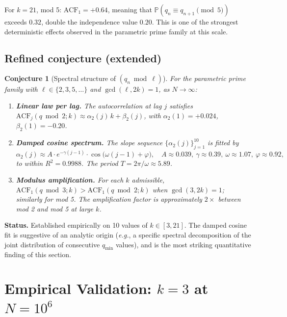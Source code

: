 \documentclass[11pt,a4paper]{article}
\theoremstyle{plain}
\newtheorem{conjecture}[theorem]{Conjecture}
\theoremstyle{definition}
\newcommand{\qmin}{q_{\min}}
\begin{document}
For $k = 21$, mod 5: $\mathrm{ACF}_1 = +0.64$, meaning that
$\mathbb{P}(q_n \equiv q_{n+1} \pmod 5)$ exceeds $0.32$, double the
independence value $0.20$. This is one of the strongest deterministic effects
observed in the parametric prime family at this scale.

\subsection{Refined conjecture (extended)}

\begin{openproblem}
\begin{conjecture}[Spectral structure of $(q_n \bmod \ell)$]\label{conj:acf}
For the parametric prime family with $\ell \in \{2, 3, 5, \ldots\}$ and
$\gcd(\ell, 2k) = 1$, as $N \to \infty$:
\begin{enumerate}[leftmargin=*]
\item \textbf{Linear law per lag.} The autocorrelation at lag $j$ satisfies
$\mathrm{ACF}_j(q \bmod 2; k) \approx \alpha_2(j)\,k + \beta_2(j)$, with
$\alpha_2(1) = +0.024$, $\beta_2(1) = -0.20$.
\item \textbf{Damped cosine spectrum.} The slope sequence $\{\alpha_2(j)\}_{j=1}^{10}$
is fitted by
\[
\alpha_2(j) \approx A \cdot e^{-\gamma(j-1)} \cdot \cos\bigl(\omega(j-1) + \varphi\bigr),
\quad A \approx 0.039,\ \gamma \approx 0.39,\ \omega \approx 1.07,\ \varphi \approx 0.92,
\]
to within $R^2 = 0.9988$. The period $T = 2\pi/\omega \approx 5.89$.
\item \textbf{Modulus amplification.} For each $k$ admissible,
$\mathrm{ACF}_1(q \bmod 3; k) > \mathrm{ACF}_1(q \bmod 2; k)$ when $\gcd(3, 2k) = 1$;
similarly for mod 5. The amplification factor is approximately $2\times$
between mod 2 and mod 5 at large $k$.
\end{enumerate}
\end{conjecture}
\end{openproblem}

\textbf{Status.} Established empirically on 10 values of $k \in [3, 21]$.
The damped cosine fit is suggestive of an analytic origin (\textit{e.g.}, a
specific spectral decomposition of the joint distribution of consecutive
$\qmin$ values), and is the most striking quantitative finding of this section.

\section{Empirical Validation: $k = 3$ at $N = 10^6$}
\label{sec:validation-k3}
\end{document}
